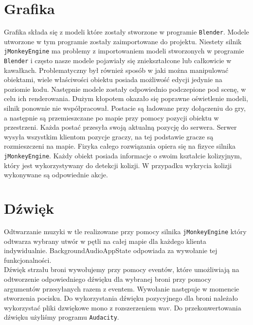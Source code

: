 \documentclass[]{report}
\newcommand{\code}[1]{\colorbox{codegray}{\texttt{#1}}}
\begin{document}
\section{Grafika}
	Grafika składa się z modeli które zostały stworzone w programie \code{Blender}.
	Modele utworzone w tym programie zostały zaimportowane do projektu.
	Niestety silnik \code{jMonkeyEngine} ma problemy z importowaniem modeli stworzonych w programie \code{Blender} i często nasze modele pojawiały się zniekształcone lub całkowicie w kawałkach.
	Problematyczny był również sposób w jaki można manipulować obiektami, wiele właściwości obiektu posiada możliwość edycji jedynie na poziomie kodu.
	Następnie modele zostały odpowiednio podczepione pod scenę, w celu ich renderowania.
	Dużym kłopotem okazało się poprawne oświetlenie modeli, silnik ponownie nie współpracował.
	Postacie są ładowane przy dołączeniu do gry, a następnie są przemieszczane po mapie przy pomocy pozycji obiektu w przestrzeni.
	Każda postać przesyła swoją aktualną pozycję do serwera.
	Serwer wysyła wszystkim klientom pozycje graczy, na tej podstawie gracze są rozmieszczeni na mapie.
	Fizyka całego rozwiązania opiera się na fizyce silnika \code{jMonkeyEngine}.
	Każdy obiekt posiada informacje o swoim kształcie kolizyjnym, który jest wykorzystywany do detekcji kolizji.
	W przypadku wykrycia kolizji wykonywane są odpowiednie akcje.

\section{Dźwięk}
	Odtwarzanie muzyki w tle realizowane przy pomocy silnika \code{jMonkeyEngine} który odtwarza wybrany utwór w pętli na całej mapie dla każdego klienta indywidualnie.
	BackgroundAudioAppState odpowiada za wywołanie tej funkcjonalności. \\
	Dźwięk strzału broni wywołujemy przy pomocy eventów, które umożliwiają na odtworzenie odpowiedniego dźwięku dla wybranej broni przy pomocy argumentów przesyłanych razem z eventem.
	Wywołanie następuje w momencie stworzenia pocisku.
	Do wykorzystania dźwięku pozycyjnego dla broni należało wykorzystać pliki dzwiękowe mono z rozszerzeniem wav.
	Do przekonwertowania dźwięku użyliśmy programu \code{Audacity}.
\end{document}
